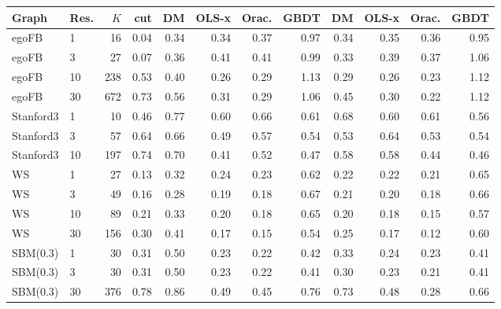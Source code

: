\begin{tabular}{llrr|rrrr|rrrr}
\toprule
Graph & Res. & $K$ & cut & DM & OLS-x & Orac. & GBDT & DM & OLS-x & Orac. & GBDT \\
\midrule
egoFB & 1 & 16 & 0.04 & 0.34 & 0.34 & 0.37 & 0.97 & 0.34 & 0.35 & 0.36 & 0.95 \\
egoFB & 3 & 27 & 0.07 & 0.36 & 0.41 & 0.41 & 0.99 & 0.33 & 0.39 & 0.37 & 1.06 \\
egoFB & 10 & 238 & 0.53 & 0.40 & 0.26 & 0.29 & 1.13 & 0.29 & 0.26 & 0.23 & 1.12 \\
egoFB & 30 & 672 & 0.73 & 0.56 & 0.31 & 0.29 & 1.06 & 0.45 & 0.30 & 0.22 & 1.12 \\
\midrule
Stanford3 & 1 & 10 & 0.46 & 0.77 & 0.60 & 0.66 & 0.61 & 0.68 & 0.60 & 0.61 & 0.56 \\
Stanford3 & 3 & 57 & 0.64 & 0.66 & 0.49 & 0.57 & 0.54 & 0.53 & 0.64 & 0.53 & 0.54 \\
Stanford3 & 10 & 197 & 0.74 & 0.70 & 0.41 & 0.52 & 0.47 & 0.58 & 0.58 & 0.44 & 0.46 \\
\midrule
WS & 1 & 27 & 0.13 & 0.32 & 0.24 & 0.23 & 0.62 & 0.22 & 0.22 & 0.21 & 0.65 \\
WS & 3 & 49 & 0.16 & 0.28 & 0.19 & 0.18 & 0.67 & 0.21 & 0.20 & 0.18 & 0.66 \\
WS & 10 & 89 & 0.21 & 0.33 & 0.20 & 0.18 & 0.65 & 0.20 & 0.18 & 0.15 & 0.57 \\
WS & 30 & 156 & 0.30 & 0.41 & 0.17 & 0.15 & 0.54 & 0.25 & 0.17 & 0.12 & 0.60 \\
\midrule
SBM(0.3) & 1 & 30 & 0.31 & 0.50 & 0.23 & 0.22 & 0.42 & 0.33 & 0.24 & 0.23 & 0.41 \\
SBM(0.3) & 3 & 30 & 0.31 & 0.50 & 0.23 & 0.22 & 0.41 & 0.30 & 0.23 & 0.21 & 0.41 \\
SBM(0.3) & 30 & 376 & 0.78 & 0.86 & 0.49 & 0.45 & 0.76 & 0.73 & 0.48 & 0.28 & 0.66 \\
\bottomrule
\end{tabular}
